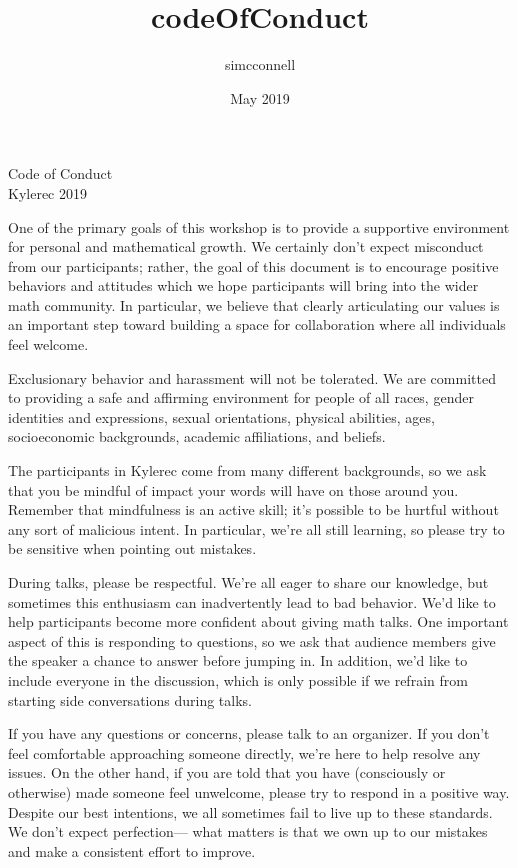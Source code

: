 \documentclass[12pt]{article}
\title{codeOfConduct}
\author{simcconnell }
\date{May 2019}
\begin{document}
\begin{center}
Code of Conduct
\\
Kylerec 2019
\end{center}

\bigskip

One of the primary goals of this workshop is to provide a supportive environment for personal and mathematical growth. We certainly don't expect misconduct from our participants; rather, the goal of this document is to encourage positive behaviors and attitudes which we hope participants will bring into the wider math community. In particular, we believe that clearly articulating our values is an important step toward building a space for collaboration where all individuals feel welcome. 

Exclusionary behavior and harassment will not be tolerated. We are committed to providing a safe and affirming environment for people of all races, gender identities and expressions, sexual orientations, physical abilities, ages, socioeconomic backgrounds, academic affiliations, and beliefs. 

The participants in Kylerec come from many different backgrounds, so we ask that you be mindful of impact your words will have on those around you. Remember that mindfulness is an active skill; it's possible to be hurtful without any sort of malicious intent. In particular, we're all still learning, so please try to be sensitive when pointing out mistakes. 

During talks, please be respectful. We're all eager to share our knowledge, but sometimes this enthusiasm can inadvertently lead to bad behavior. We'd like to help participants become more confident about giving math talks. One important aspect of this is responding to questions, so we ask that audience members give the speaker a chance to answer before jumping in. In addition, we'd like to include everyone in the discussion, which is only possible if we refrain from starting side conversations during talks. 

If you have any questions or concerns, please talk to an organizer. If you don't feel comfortable approaching someone directly, we're here to help resolve any issues. On the other hand, if you are told that you have (consciously or otherwise) made someone feel unwelcome, please try to respond in a positive way. Despite our best intentions, we all sometimes fail to live up to these standards. We don't expect perfection--- what matters is that we own up to our mistakes and make a consistent effort to improve. 
\end{document}
